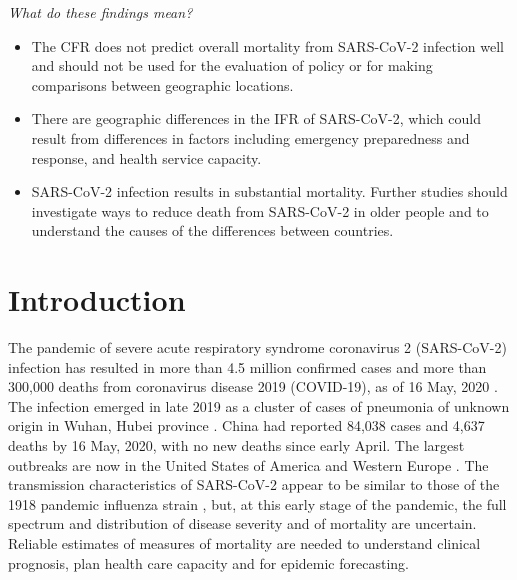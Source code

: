 \documentclass{article}
\begin{document}
\textit{What do these findings mean?}
\begin{itemize}
\item The CFR does not predict overall mortality from SARS-CoV-2 infection well and should not be used for the evaluation of policy or for making comparisons between geographic locations.
\item There are geographic differences in the IFR of SARS-CoV-2, which could result from differences in factors including emergency preparedness and response, and health service capacity.
\item SARS-CoV-2 infection results in substantial mortality. Further studies should investigate ways to reduce death from SARS-CoV-2 in older people and to understand the causes of the differences between countries.  
\end{itemize}

\section*{Introduction}

The pandemic of severe acute respiratory syndrome coronavirus 2 (SARS-CoV-2) infection has resulted in more than 4.5 million confirmed cases and more than 300,000 deaths from coronavirus disease 2019 (COVID-19), as of 16 May, 2020 \cite{whoreport117}. 
The infection emerged in late 2019 as a cluster of cases of pneumonia of unknown origin in Wuhan, Hubei province \cite{wang2020novel,huang2020clinical}. 
China had reported 84,038 cases and 4,637 deaths by 16 May, 2020, with no new deaths since early April. 
The largest outbreaks are now in the United States of America and Western Europe . 
The transmission characteristics of SARS-CoV-2 appear to be similar to those of the 1918 pandemic influenza strain \cite{riou2020pattern}, but, at this early stage of the pandemic, the full spectrum and distribution of disease severity and of mortality are uncertain. 
Reliable estimates of measures of mortality are needed to understand clinical prognosis, plan health care capacity and for epidemic forecasting. 
\end{document}

